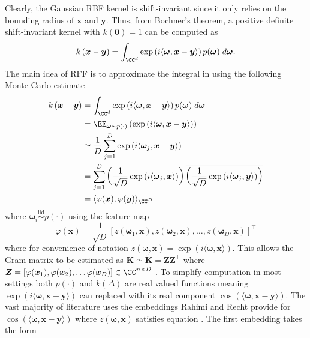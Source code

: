Clearly, the Gaussian RBF kernel is shift-invariant since it only relies on the bounding radius of $\bm{x}$ and $\bm{y}$. Thus, from Bochner's theorem, a positive definite shift-invariant kernel with $k(\bm{0}) = 1$ can be computed as
\begin{equation} \label{eq: rff_boch_int}
    k \left( \bm{x} - \bm{y} \right) = \int_{\CC^d} \exp \left( i \langle \bm{\omega} , \bm{x} - \bm{y} \rangle \right) p (\bm{\omega}) \; d \bm{\omega} .
\end{equation}
The main idea of RFF is to approximate the integral in   using the following Monte-Carlo estimate
\begin{align*}
    k \left( \bm{x} - \bm{y} \right)
     & = \int_{\CC^d} \exp \left( i \langle \bm{\omega} , \bm{x} - \bm{y} \rangle \right) p (\bm{\omega}) \; d \bm{\omega}                                                                                                            \\
     & = \EE_{\bm{\omega} \sim p (\cdot)} \left( \exp \left( i \langle \bm{\omega} , \bm{x} - \bm{y} \rangle \right) \right)                                                                                                          \\
     & \simeq \frac{1}{D} \sum_{j=1}^{D} \exp \left( i \langle \bm{\omega}_{j} , \bm{x} - \bm{y} \rangle \right)                                                                                                                      \\
     & = \sum_{j=1}^{D} \left( \frac{1}{\sqrt{D}} \exp \left( i \langle \bm{\omega}_{j} , \bm{x} \rangle \right) \right) \overline{\left( \frac{1}{\sqrt{D}} \exp \left( i \langle \bm{\omega}_{j} , \bm{y} \rangle \right) \right) } \\
     & = \langle \varphi (\bm{x}) , \varphi (\bm{y}) \rangle_{\CC^D}
\end{align*}
where $\bm{\omega}_i \stackrel{\text{iid}}{\sim} p(\cdot)$ using the feature map
\begin{equation}
    \varphi (\bm{x}) = \frac{1}{\sqrt{D}} \left[ z \left( \bm{\omega}_1, \bm{x} \right), z \left( \bm{\omega}_2, \bm{x} \right), \ldots , z \left( \bm{\omega}_D, \bm{x} \right) \right]^{\intercal}
\end{equation}
where for convenience of notation $z \left( \bm{\omega}, \bm{x} \right) = \exp \left( i \langle \bm{\omega} , \bm{x} \rangle \right)$. This allows the Gram matrix to be estimated as $\bm{K} \simeq \bm{\widetilde{K}} = \bm{Z} \bm{Z}^{\intercal}$ where $\bm{Z} = \left[ \varphi (\bm{x}_1), \varphi (\bm{x}_2), \ldots \varphi (\bm{x}_D) \right] \in \CC^{n \times D}$ \cite{NIPS2007_013a006f,LiuFanghui2021RFfK,JMLR:v17:14-538}. To simplify computation in most settings both $p(\cdot)$ and $k(\Delta)$ are real valued functions meaning $\exp \left( i \langle \bm{\omega} , \bm{x} - \bm{y} \rangle \right)$ can replaced with its real component $\cos \left( \langle \bm{\omega} , \bm{x} - \bm{y} \rangle \right)$. The vast majority of literature uses the embeddings Rahimi and Recht provide for $\cos \left( \langle \bm{\omega} , \bm{x} - \bm{y} \rangle \right)$ where $z \left( \bm{\omega}, \bm{x} \right)$ satisfies equation  . The first embedding takes the form
